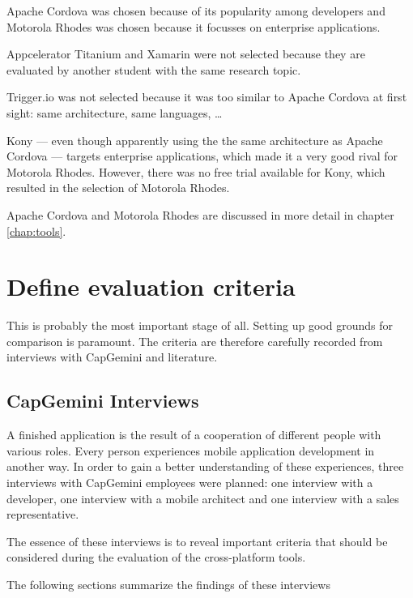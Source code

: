 Apache Cordova was chosen because of its popularity among developers and Motorola Rhodes was chosen because it focusses on enterprise applications. 

Appcelerator Titanium and Xamarin were not selected because they are evaluated by another student with the same research topic. 

Trigger.io was not selected because it was too similar to Apache Cordova at first sight: same architecture, same languages, \ldots


Kony --- even though apparently using the the same architecture as Apache Cordova --- targets enterprise applications, which made it a very good rival for Motorola Rhodes. However, there was no free trial available for Kony, which resulted in the selection of Motorola Rhodes.

Apache Cordova and Motorola Rhodes are discussed in more detail in chapter \ref{chap:tools}.

\section{Define evaluation criteria}

This is probably the most important stage of all. Setting up good grounds for comparison is paramount. The criteria are therefore carefully recorded from interviews with CapGemini and literature.

\subsection{CapGemini Interviews}

A finished application is the result of a cooperation of different people with various roles. Every person experiences mobile application development in another way. In order to gain a better understanding of these experiences, three interviews with CapGemini employees were planned: one interview with a developer, one interview with a mobile architect and one interview with a sales representative. 

The essence of these interviews is to reveal important criteria that should be considered during the evaluation of the cross-platform tools.

The following sections summarize the findings of these interviews

